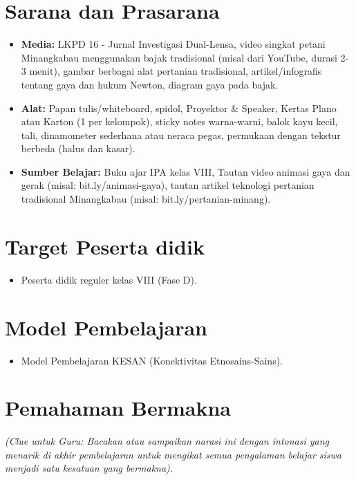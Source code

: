 \documentclass[12pt,a4paper]{article}
\begin{document}
\section{Sarana dan Prasarana}

\begin{itemize}
\item \textbf{Media:} LKPD 16 - Jurnal Investigasi Dual-Lensa, video singkat petani Minangkabau menggunakan bajak tradisional (misal dari YouTube, durasi 2-3 menit), gambar berbagai alat pertanian tradisional, artikel/infografis tentang gaya dan hukum Newton, diagram gaya pada bajak.
\item \textbf{Alat:} Papan tulis/whiteboard, spidol, Proyektor \& Speaker, Kertas Plano atau Karton (1 per kelompok), sticky notes warna-warni, balok kayu kecil, tali, dinamometer sederhana atau neraca pegas, permukaan dengan tekstur berbeda (halus dan kasar).
\item \textbf{Sumber Belajar:} Buku ajar IPA kelas VIII, Tautan video animasi gaya dan gerak (misal: bit.ly/animasi-gaya), tautan artikel teknologi pertanian tradisional Minangkabau (misal: bit.ly/pertanian-minang).
\end{itemize}

\section{Target Peserta didik}

\begin{itemize}
\item Peserta didik reguler kelas VIII (Fase D).
\end{itemize}

\section{Model Pembelajaran}

\begin{itemize}
\item Model Pembelajaran KESAN (Konektivitas Etnosains-Sains).
\end{itemize}

\section{Pemahaman Bermakna}
\textit{(Clue untuk Guru: Bacakan atau sampaikan narasi ini dengan intonasi yang menarik di akhir pembelajaran untuk mengikat semua pengalaman belajar siswa menjadi satu kesatuan yang bermakna).}
\end{document}
